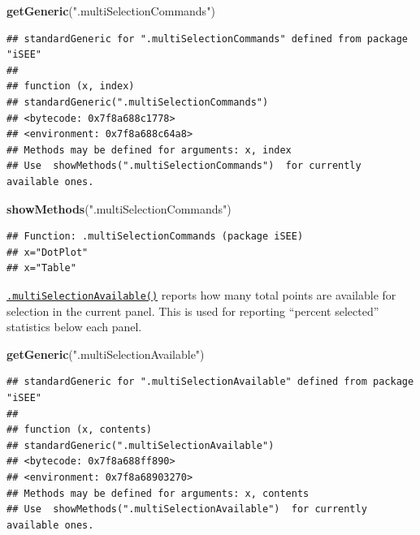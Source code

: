 \documentclass[
]{book}
\newenvironment{Shaded}{\begin{snugshade}}{\end{snugshade}}
\newcommand{\KeywordTok}[1]{\textcolor[rgb]{0.13,0.29,0.53}{\textbf{#1}}}
\newcommand{\NormalTok}[1]{#1}
\newcommand{\StringTok}[1]{\textcolor[rgb]{0.31,0.60,0.02}{#1}}
\begin{document}
\begin{Shaded}
\begin{Highlighting}[]
\KeywordTok{getGeneric}\NormalTok{(}\StringTok{".multiSelectionCommands"}\NormalTok{)}
\end{Highlighting}
\end{Shaded}

\begin{verbatim}
## standardGeneric for ".multiSelectionCommands" defined from package "iSEE"
## 
## function (x, index) 
## standardGeneric(".multiSelectionCommands")
## <bytecode: 0x7f8a688c1778>
## <environment: 0x7f8a688c64a8>
## Methods may be defined for arguments: x, index
## Use  showMethods(".multiSelectionCommands")  for currently available ones.
\end{verbatim}

\begin{Shaded}
\begin{Highlighting}[]
\KeywordTok{showMethods}\NormalTok{(}\StringTok{".multiSelectionCommands"}\NormalTok{)}
\end{Highlighting}
\end{Shaded}

\begin{verbatim}
## Function: .multiSelectionCommands (package iSEE)
## x="DotPlot"
## x="Table"
\end{verbatim}

\href{https://isee.github.io/iSEE/reference/multi-select-generics.html}{\texttt{.multiSelectionAvailable()}} reports how many total points are available for selection in the current panel.
This is used for reporting ``percent selected'' statistics below each panel.

\begin{Shaded}
\begin{Highlighting}[]
\KeywordTok{getGeneric}\NormalTok{(}\StringTok{".multiSelectionAvailable"}\NormalTok{)}
\end{Highlighting}
\end{Shaded}

\begin{verbatim}
## standardGeneric for ".multiSelectionAvailable" defined from package "iSEE"
## 
## function (x, contents) 
## standardGeneric(".multiSelectionAvailable")
## <bytecode: 0x7f8a688ff890>
## <environment: 0x7f8a68903270>
## Methods may be defined for arguments: x, contents
## Use  showMethods(".multiSelectionAvailable")  for currently available ones.
\end{verbatim}
\end{document}
